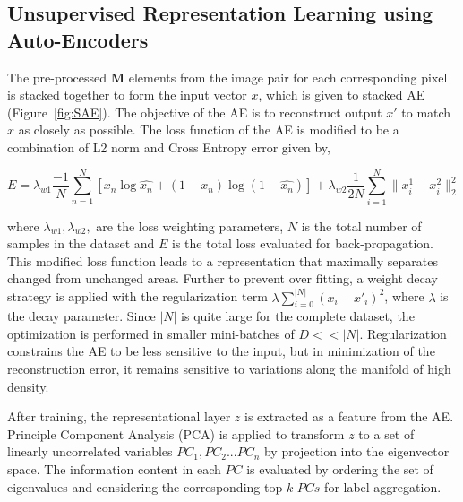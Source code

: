 \subsection{Unsupervised Representation Learning using Auto-Encoders}
\label{sub:ae}

The pre-processed $\mathbf{M}$ elements from the image pair for each corresponding pixel is stacked together  to form the input vector $x$, which is given to stacked AE (Figure~\ref{fig:SAE}). The objective of the AE is to reconstruct output $x'$ to match $x$ as closely as possible. The loss function of the AE is modified to be a combination of L2 norm and Cross Entropy error given by,

\begin{dmath} 
E = \lambda_{w1} \frac{-1}{N}\sum_{n=1}^{N}[x_n \log \hat{x_n} + (1 - x_n)\log(1-\hat{x_n})] 
     + \lambda_{w2} \frac 1 {2N} \sum_{i=1}^N \| x^1_i - x^2_i \|_2^2
\end{dmath}

where $\lambda_{w1},\lambda_{w2},$ are the loss weighting parameters, $N$ is the total number of samples in the dataset and $E$ is the total loss evaluated for back-propagation. This modified loss function leads to a representation that maximally separates changed from unchanged areas. Further to prevent over fitting, a weight decay strategy is applied with the regularization term $\lambda \sum_{i=0}^{|N|} (x_i-x'_i)^2$, where $\lambda$ is the decay parameter. Since $|N|$ is quite large for the complete dataset, the optimization is performed in smaller mini-batches of $D << |N|$. Regularization constrains the AE to be less sensitive to the input, but in minimization of the reconstruction error, it remains sensitive to variations along the manifold of high density. %

After  training, the representational layer $z$ is extracted as a feature from the AE. Principle Component Analysis (PCA) is applied to transform $z$  to a set of linearly uncorrelated variables $PC_1, PC_2... PC_n$ by projection into the eigenvector space. The information content in each $PC$ is evaluated by ordering the set of eigenvalues and considering the corresponding top $k$ $PCs$ for label aggregation. 

